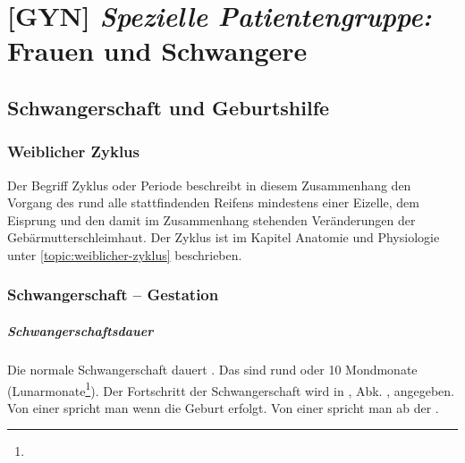 \chapter{[GYN] \emph{Spezielle Patientengruppe:} Frauen und Schwangere}
\minitoc


\section{Schwangerschaft und Geburtshilfe}

\subsection{Weiblicher Zyklus}

Der Begriff Zyklus oder Periode beschreibt in diesem Zusammenhang den Vorgang
des rund alle  stattfindenden Reifens
mindestens einer Eizelle, dem Eisprung und den damit im Zusammenhang stehenden Veränderungen der
Gebärmutterschleimhaut. Der Zyklus ist im Kapitel Anatomie und Physiologie
unter \ref{topic:weiblicher-zyklus} beschrieben.








\subsection{Schwangerschaft -- Gestation}

\paragraph{Schwangerschaftsdauer} Die normale Schwangerschaft dauert . Das sind rund  oder 10
Mondmonate (Lunarmonate\footnote{}). Der Fortschritt der
Schwangerschaft wird in , Abk. , angegeben. Von
einer  spricht man wenn die Geburt
erfolgt. Von einer  spricht man ab der .

